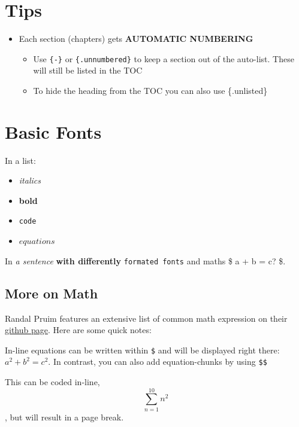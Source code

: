 \documentclass[
]{book}
\providecommand{\tightlist}{%
  \setlength{\itemsep}{0pt}\setlength{\parskip}{0pt}}
\begin{document}
\hypertarget{tips}{%
\section*{Tips}\label{tips}}

\begin{itemize}
\tightlist
\item
  Each section (chapters) gets \textbf{AUTOMATIC NUMBERING}

  \begin{itemize}
  \tightlist
  \item
    Use \texttt{\{-\}} or \texttt{\{.unnumbered\}} to keep a section out of the auto-list. These will still be listed in the TOC
  \item
    To hide the heading from the TOC you can also use \{.unlisted\}
  \end{itemize}
\end{itemize}

\hypertarget{basic-fonts}{%
\section*{Basic Fonts}\label{basic-fonts}}

In a list:

\begin{itemize}
\item
  \emph{italics}
\item
  \textbf{bold}
\item
  \texttt{code}
\item
  \(equations\)
\end{itemize}

In \emph{a sentence} \textbf{with differently} \texttt{formated\ fonts} and maths \$ a + b
= c? \$.

\hypertarget{more-on-math}{%
\subsection{More on Math}\label{more-on-math}}

Randal Pruim features an extensive list of common math expression on
their \href{https://rpruim.github.io/s341/S19/from-class/MathinRmd.html}{github
page}. Here
are some quick notes:

In-line equations can be written within \texttt{\$} and will be displayed right
there: \(a^2 + b^2 = c^2\). In contrast, you can also add equation-chunks
by using \texttt{\$\$}

This can be coded in-line, \[\sum_{n=1}^{10} n^2\], but will result in a
page break.
\end{document}
